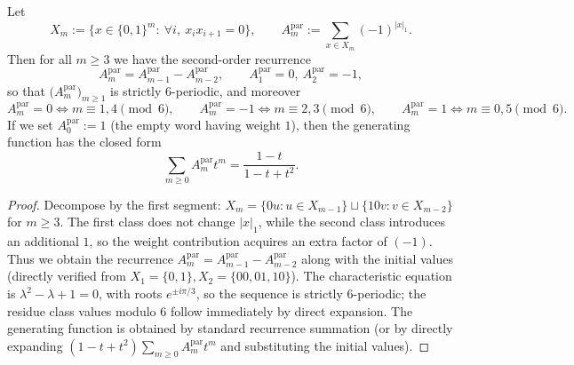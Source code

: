 \begin{conclusion}\label{con:xi-terminal-xm-parity-weight-6period}
Let
\[
X_m:=\{x\in\{0,1\}^m:\ \forall i,\ x_ix_{i+1}=0\},
\qquad
A_m^{\mathrm{par}}:=\sum_{x\in X_m}(-1)^{|x|_1}.
\]
Then for all \(m\ge 3\) we have the second-order recurrence
\[
A_m^{\mathrm{par}}=A_{m-1}^{\mathrm{par}}-A_{m-2}^{\mathrm{par}},
\qquad
A_1^{\mathrm{par}}=0,\ A_2^{\mathrm{par}}=-1,
\]
so that \(\bigl(A_m^{\mathrm{par}}\bigr)_{m\ge 1}\) is strictly \(6\)-periodic, and moreover
\[
A_m^{\mathrm{par}}=0\iff m\equiv 1,4\pmod 6,\qquad
A_m^{\mathrm{par}}=-1\iff m\equiv 2,3\pmod 6,\qquad
A_m^{\mathrm{par}}=1\iff m\equiv 0,5\pmod 6.
\]
If we set \(A_0^{\mathrm{par}}:=1\) (the empty word having weight \(1\)), then the generating function has the closed form
\[
\sum_{m\ge 0}A_m^{\mathrm{par}}t^m=\frac{1-t}{1-t+t^2}.
\]
\end{conclusion}
\begin{proof}
Decompose by the first segment: \(X_m=\{0u:u\in X_{m-1}\}\sqcup \{10v:v\in X_{m-2}\}\) for \(m\ge 3\).
The first class does not change \(|x|_1\), while the second class introduces an additional \(1\), so the weight contribution acquires an extra factor of \((-1)\).
Thus we obtain the recurrence
\(
A_m^{\mathrm{par}}=A_{m-1}^{\mathrm{par}}-A_{m-2}^{\mathrm{par}}
\)
along with the initial values (directly verified from \(X_1=\{0,1\},X_2=\{00,01,10\}\)).
The characteristic equation is \(\lambda^2-\lambda+1=0\), with roots \(e^{\pm i\pi/3}\), so the sequence is strictly \(6\)-periodic;
the residue class values modulo \(6\) follow immediately by direct expansion.
The generating function is obtained by standard recurrence summation (or by directly expanding \((1-t+t^2)\sum_{m\ge 0}A_m^{\mathrm{par}}t^m\) and substituting the initial values).
\end{proof}




